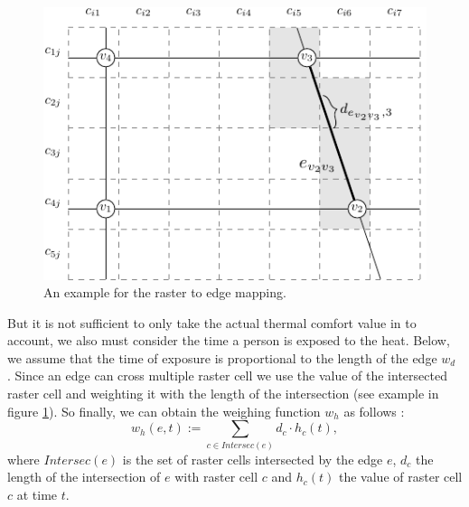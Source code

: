 \begin{figure}
	\centering
	\includegraphics{figures/raster-edge-mapping-standalone}
	\caption[Example for the raster to edge mapping]{An 
		example for the raster to edge mapping.}
	\label{fig:raster-edge-mapping}
\end{figure}


But it is not sufficient to only take the actual thermal comfort value  in to account, we also must consider the time a person is exposed to the heat. Below, we assume that the time of exposure is proportional to the length of the edge $w_d$ \parencite[following][]{Hasenfratz2015}. Since an edge can cross multiple raster cell we use the value of the intersected raster cell and weighting it with the length of the intersection (see example in figure \ref{fig:raster-edge-mapping}). So finally, we can obtain the weighing function  $w_h$ as follows \parencite[cf.][]{Hasenfratz2015}: 
 	\begin{equation}\label{eq:edge-weight}
 		w_h(e, t) := \sum_{c \in Intersec(e)} d_c \cdot h_c(t),
 	\end{equation}
where $Intersec(e)$ is the set of raster cells intersected by the edge $e$, $d_c$ the length of the intersection of $e$ with raster cell $c$ and $h_c(t)$ the value of raster cell $c$ at time $t$.

 

